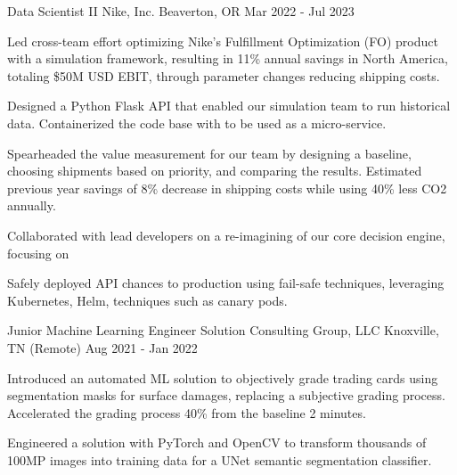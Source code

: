 


\begin{cventries}


\cventry
{Data Scientist II} %
{Nike, Inc.} %
{Beaverton, OR} %
{Mar 2022 - Jul 2023} %
{ %
\begin{cvitems}
\item {
Led cross-team effort optimizing Nike's Fulfillment Optimization (FO) product with a simulation framework, resulting in 11\% annual savings in North America, totaling \$50M USD EBIT, through parameter changes reducing shipping costs.
}
\item {
Designed a Python Flask API that enabled our simulation team to run historical data. Containerized the code base with to be used as a micro-service.
}
\item {
Spearheaded the value measurement for our team by designing a baseline, choosing shipments based on priority, and comparing the results. Estimated previous year savings of 8\% decrease in shipping costs while using 40\% less CO2 annually.
}
\item {
Collaborated with lead developers on a re-imagining of our core decision engine, focusing on
}
\item {
 Safely deployed API chances to production using fail-safe techniques, leveraging Kubernetes, Helm, techniques such as canary pods.
}
\end{cvitems}
}


\cventry
{Junior Machine Learning Engineer} %
{Solution Consulting Group, LLC} %
{Knoxville, TN (Remote)} %
{Aug 2021 - Jan 2022} %
{ %
\begin{cvitems}
\item {Introduced an automated ML solution to objectively grade trading cards using segmentation masks for surface damages, replacing a subjective grading process. Accelerated the grading process 40\% from the baseline 2 minutes.}
\item {Engineered a solution with PyTorch and OpenCV to transform thousands of 100MP images into training data for a UNet semantic segmentation classifier.}
\end{cvitems}
}


\end{cventries}
